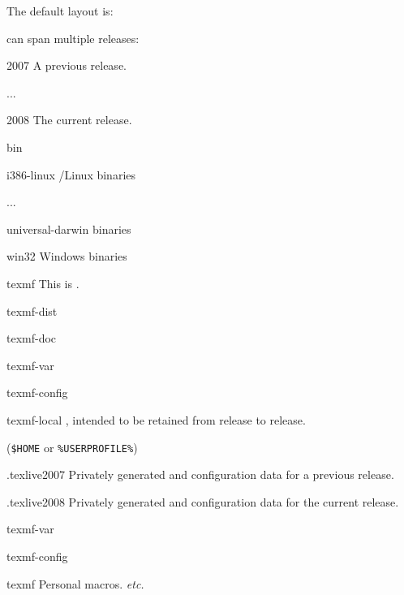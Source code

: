 \documentclass{article}
\begin{document}
\noindent
The default layout is:
\begin{description}
  \item[system-wide root] can span multiple \TL{} releases:
  \begin{ttdescription}
    \item[2007] A previous release.
    \begin{ttdescription}
      \item [...]
    \end{ttdescription}
    \item[2008] The current release.
    \begin{ttdescription}
      \item [bin] ~
      \begin{ttdescription}
        \item [i386-linux] \GNU/Linux binaries
        \item [...]
        \item [universal-darwin] \MacOSX binaries
        \item [win32] Windows binaries
      \end{ttdescription}
      \item [texmf] This is .
      \item [texmf-dist] 
      \item [texmf-doc] 
      \item [texmf-var] 
      \item [texmf-config] 
    \end{ttdescription}
    \item [texmf-local] , intended to be
      retained from release to release.
  \end{ttdescription}
  \item[user's home] (\texttt{\$HOME} or
      \texttt{\%USERPROFILE\%})
    \begin{ttdescription}
      \item[.texlive2007] Privately generated and configuration data
        for a previous release.
      \item[.texlive2008] Privately generated and configuration data
        for the current release.
      \begin{ttdescription}
        \item [texmf-var] 
        \item [texmf-config] 
      \end{ttdescription}
    \item[texmf]  Personal macros.
      \textit{etc.}
  \end{ttdescription}
\end{description}
\end{document}
